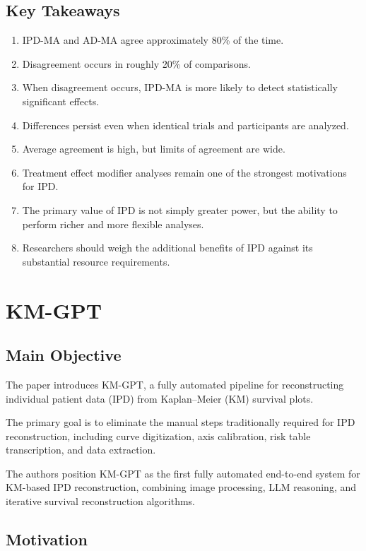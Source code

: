 \documentclass[11pt]{article}
\begin{document}
\subsection*{Key Takeaways}

\begin{enumerate}
    \item IPD-MA and AD-MA agree approximately 80\% of the time.
    \item Disagreement occurs in roughly 20\% of comparisons.
    \item When disagreement occurs, IPD-MA is more likely to detect statistically significant effects.
    \item Differences persist even when identical trials and participants are analyzed.
    \item Average agreement is high, but limits of agreement are wide.
    \item Treatment effect modifier analyses remain one of the strongest motivations for IPD.
    \item The primary value of IPD is not simply greater power, but the ability to perform richer and more flexible analyses.
    \item Researchers should weigh the additional benefits of IPD against its substantial resource requirements.
\end{enumerate}

\section{KM-GPT}

\subsection*{Main Objective}

The paper introduces KM-GPT, a fully automated pipeline for reconstructing individual patient data (IPD) from Kaplan--Meier (KM) survival plots.

The primary goal is to eliminate the manual steps traditionally required for IPD reconstruction, including curve digitization, axis calibration, risk table transcription, and data extraction. 

The authors position KM-GPT as the first fully automated end-to-end system for KM-based IPD reconstruction, combining image processing, LLM reasoning, and iterative survival reconstruction algorithms.

\subsection*{Motivation}
\end{document}
